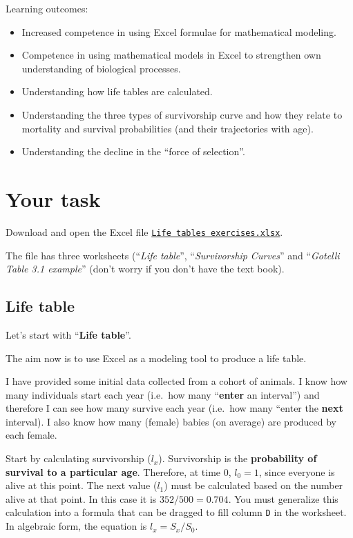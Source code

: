 \documentclass[
  a4paper]{book}
\providecommand{\tightlist}{%
  \setlength{\itemsep}{0pt}\setlength{\parskip}{0pt}}
\begin{document}
\begin{do-something}
Learning outcomes:

\begin{itemize}
\tightlist
\item
  Increased competence in using Excel formulae for mathematical
  modeling.
\item
  Competence in using mathematical models in Excel to strengthen own
  understanding of biological processes.
\item
  Understanding how life tables are calculated.
\item
  Understanding the three types of survivorship curve and how they
  relate to mortality and survival probabilities (and their trajectories
  with age).
\item
  Understanding the decline in the ``force of selection''.
\end{itemize}
\end{do-something}

\section{Your task}\label{your-task-7}

Download and open the Excel file \href{https://www.dropbox.com/s/ox0rk05zdwzrmwy/Life\%20tables\%20exercises.xlsx?dl=1}{\texttt{Life\ tables\ exercises.xlsx}}.

The file has three worksheets (``\emph{Life table}'', ``\emph{Survivorship Curves}'' and ``\emph{Gotelli
Table 3.1 example}'' (don't worry if you don't have the text book).

\subsection{Life table}\label{life-table}

Let's start with ``\textbf{Life table}''.

The aim now is to use Excel as a modeling tool to produce a life table.

I have provided some initial data collected from a cohort of animals. I know how many individuals start each year (i.e.~how many ``\textbf{enter} an interval'') and therefore I can see how many survive each year (i.e.~how many ``enter the \textbf{next} interval). I also know how many (female) babies (on average) are produced by each female.

Start by calculating survivorship (\(l_x\)). Survivorship is the \textbf{probability of survival to a particular age}. Therefore, at time 0, \(l_0 = 1\), since everyone is alive at this point. The next value (\(l_1\)) must be calculated based on the number alive at that point. In this case it is \(352/500 = 0.704\). You must generalize this calculation into a formula that can be dragged to fill column \texttt{D} in the worksheet. In algebraic form, the equation is \(l_x = S_x/S_0\).
\end{document}
